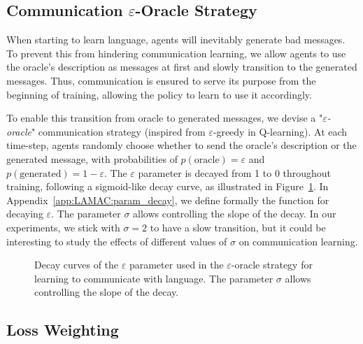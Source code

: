 

\subsection{Communication $\varepsilon$-Oracle Strategy}\label{sec:LAMAC:CommEps}

When starting to learn language, agents will inevitably generate bad messages. To prevent this from hindering communication learning, we allow agents to use the oracle's description as messages at first and slowly transition to the generated messages. Thus, communication is ensured to serve its purpose from the beginning of training, allowing the policy to learn to use it accordingly. 

To enable this transition from oracle to generated messages, we devise a "\textit{$\varepsilon$-oracle}" communication strategy (inspired from $\varepsilon$-greedy in Q-learning). At each time-step, agents randomly choose whether to send the oracle's description or the generated message, with probabilities of $p(\text{oracle})=\varepsilon$ and $p(\text{generated})=1-\varepsilon$. The $\varepsilon$ parameter is decayed from 1 to 0 throughout training, following a sigmoid-like decay curve, as illustrated in Figure~\ref{fig:LAMAC:comm_eps}. In Appendix~\ref{app:LAMAC:param_decay}, we define formally the function for decaying $\varepsilon$. The parameter $\sigma$ allows controlling the slope of the decay. In our experiments, we stick with $\sigma=2$ to have a slow transition, but it could be interesting to study the effects of different values of $\sigma$ on communication learning. 

\begin{figure}
    \centering
    
    \caption{Decay curves of the $\varepsilon$ parameter used in the $\varepsilon$-oracle strategy for learning to communicate with language. The parameter $\sigma$ allows controlling the slope of the decay.}
    \label{fig:LAMAC:comm_eps}
\end{figure}

\subsection{Loss Weighting}\label{sec:LAMAC:DynaWeightLoss}


